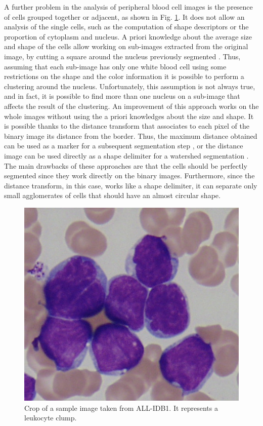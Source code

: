 \documentclass[final,a4paper,12pt,english]{UnicaPhdThesis3}
\begin{document}
A further problem in the analysis of peripheral blood cell images is the presence of cells grouped together or adjacent, as shown in Fig. \ref{fig_clumps}. It does not allow an analysis of the single cells, such as the computation of shape descriptors or the proportion of cytoplasm and nucleus. A priori knowledge about the average size and shape of the cells allow working on sub-images extracted from the original image, by cutting a square around the nucleus previously segmented \cite{Kovalev, Sinha}. Thus, assuming that each sub-image has only one white blood cell using some restrictions on the shape and the color information it is possible to perform a clustering around the nucleus. Unfortunately, this assumption is not always true, and in fact, it is possible to find more than one nucleus on a sub-image that affects the result of the clustering. An improvement of this approach works on the whole images without using the a priori knowledges about the size and shape. It is possible thanks to the distance transform \cite{Maurer} that associates to each pixel of the binary image its distance from the border. Thus, the maximum distance obtained can be used as a marker for a subsequent segmentation step \cite{Malpica}, or the distance image can be used directly as a shape delimiter for a watershed segmentation \cite{Lindblad}. The main drawbacks of these approaches are that the cells should be perfectly segmented since they work directly on the binary images. Furthermore, since the distance transform, in this case, works like a shape delimiter, it can separate only small agglomerates of cells that should have an almost circular shape.

\begin{figure}[h]
	\centering
	\includegraphics[height=0.25\textwidth]{images/2016_1_mva/clump}
	\caption{\label{fig_clumps}Crop of a sample image taken from ALL-IDB1. It represents a leukocyte clump.}
\end{figure}
\end{document}
